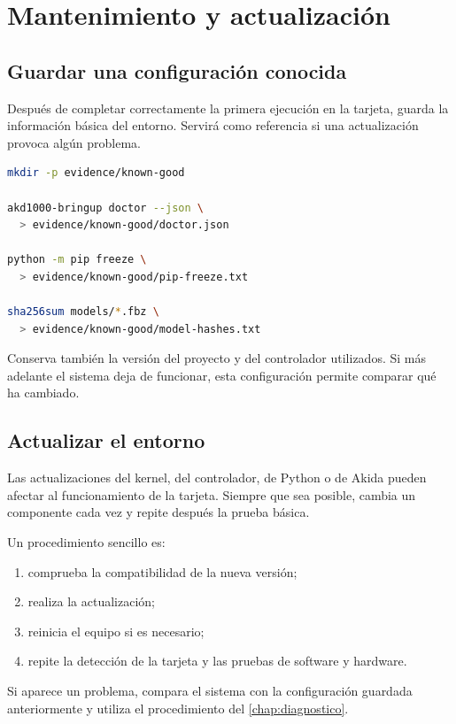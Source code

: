 \chapter{Mantenimiento y actualización}
\label{chap:mantenimiento}

\section{Guardar una configuración conocida}

Después de completar correctamente la primera ejecución en la tarjeta, guarda la información
básica del entorno. Servirá como referencia si una actualización provoca algún problema.

\begin{lstlisting}[language=bash]
mkdir -p evidence/known-good

akd1000-bringup doctor --json \
  > evidence/known-good/doctor.json

python -m pip freeze \
  > evidence/known-good/pip-freeze.txt

sha256sum models/*.fbz \
  > evidence/known-good/model-hashes.txt
\end{lstlisting}

Conserva también la versión del proyecto y del controlador utilizados. Si más adelante
el sistema deja de funcionar, esta configuración permite comparar qué ha cambiado.

\section{Actualizar el entorno}

Las actualizaciones del kernel, del controlador, de Python o de Akida pueden afectar al
funcionamiento de la tarjeta. Siempre que sea posible, cambia un componente cada vez y
repite después la prueba básica.

Un procedimiento sencillo es:

\begin{enumerate}
  \item comprueba la compatibilidad de la nueva versión;
  \item realiza la actualización;
  \item reinicia el equipo si es necesario;
  \item repite la detección de la tarjeta y las pruebas de software y hardware.
\end{enumerate}

Si aparece un problema, compara el sistema con la configuración guardada anteriormente
y utiliza el procedimiento del \cref{chap:diagnostico}.

